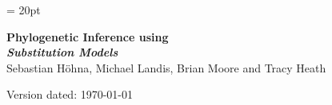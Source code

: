 \documentclass[11pt]{article}
\begin{document}
\renewcommand{\headrulewidth}{0.5pt}
\headsep = 20pt
\lhead{ }

\thispagestyle{plain}
\begin{center}

\textbf{\LARGE Phylogenetic Inference using \RevBayes}\\\vspace{2mm}
\textbf{\it{\Large Substitution Models}}\\\vspace{2mm}
\vspace{1cm}
{\Large Sebastian H{\"o}hna, Michael Landis, Brian Moore and Tracy Heath}
\vspace{1cm}
\end{center}

\def \ResourcePath {./}
\def \GlobalResourcePath {../}


Version dated: \today
\end{document}
